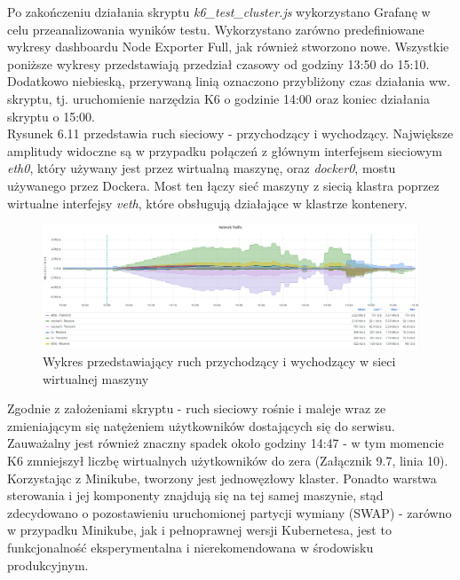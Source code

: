 Po zakończeniu działania skryptu \textit{k6\_test\_cluster.js} wykorzystano Grafanę w celu przeanalizowania wyników testu. Wykorzystano zarówno predefiniowane wykresy dashboardu Node Exporter Full, jak również stworzono nowe. Wszystkie poniższe wykresy przedstawiają przedział czasowy od godziny 13:50 do 15:10. Dodatkowo niebieską, przerywaną linią oznaczono przybliżony czas działania ww. skryptu, tj. uruchomienie narzędzia K6 o godzinie 14:00 oraz koniec działania skryptu o 15:00.\\

Rysunek 6.11 przedstawia ruch sieciowy - przychodzący i wychodzący. Największe amplitudy widoczne są w przypadku połączeń z głównym interfejsem sieciowym \textit{eth0}, który używany jest przez wirtualną maszynę, oraz \textit{docker0}, mostu używanego przez Dockera. Most ten łączy sieć maszyny z siecią klastra poprzez wirtualne interfejsy \textit{veth}, które obsługują działające w klastrze kontenery.

\begin{figure}[H]
    \centering
    \includegraphics[width=1\textwidth]{img/test_one/network111.png}
    \caption{Wykres przedstawiający ruch przychodzący i wychodzący w sieci wirtualnej maszyny}
\end{figure}



Zgodnie z założeniami skryptu - ruch sieciowy rośnie i maleje wraz ze zmieniającym się natężeniem użytkowników dostających się do serwisu. Zauważalny jest również znaczny spadek około godziny 14:47 - w tym momencie K6 zmniejszył liczbę wirtualnych użytkowników do zera (Załącznik 9.7, linia 10).\\

Korzystając z Minikube, tworzony jest jednowęzłowy klaster. Ponadto warstwa sterowania i jej komponenty znajdują się na tej samej maszynie, stąd zdecydowano o pozostawieniu uruchomionej partycji wymiany (SWAP) - zarówno w przypadku Minikube, jak i pełnoprawnej wersji Kubernetesa, jest to funkcjonalność eksperymentalna i nierekomendowana w środowisku produkcyjnym. 

